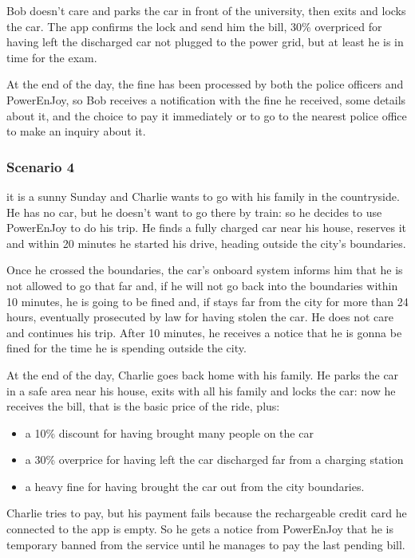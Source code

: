 \documentclass[11pt]{article} %
\newcommand{\pe}{PowerEnJoy }
\newcommand{\pecomma}{PowerEnJoy, }
\begin{document}
Bob doesn't care and parks the car in front of the university, then exits and locks the car. The app confirms the lock and send him the bill, 30\% overpriced for having left the discharged car not plugged to the power grid, but at least he is in time for the exam.

At the end of the day, the fine has been processed by both the police officers and \pecomma so Bob receives a notification with the fine he received, some details about it, and the choice to pay it immediately or to go to the nearest police office to make an inquiry about it.


\subsubsection{Scenario 4}
it is a sunny Sunday and Charlie wants to go with his family in the countryside. He has no car, but he doesn't want to go there by train: so he decides to use \pe to do his trip. He finds a fully charged car near his house, reserves it and within 20 minutes he started his drive, heading outside the city's boundaries.

Once he crossed the boundaries, the car's onboard system informs him that he is not allowed to go that far and, if he will not go back into the boundaries within 10 minutes, he is going to be fined and, if stays far from the city for more than 24 hours, eventually prosecuted by law for having stolen the car. He does not care and continues his trip. After 10 minutes, he receives a notice that he is gonna be fined for the time he is spending outside the city.

At the end of the day, Charlie goes back home with his family. He parks the car in a safe area near his house, exits with all his family and locks the car: now he receives the bill, that is the basic price of the ride, plus:
\begin{itemize}
	\item a 10\% discount for having brought many people on the car
	\item a 30\% overprice for having left the car discharged far from a charging station
	\item a heavy fine for having brought the car out from the city boundaries.
\end{itemize}
Charlie tries to pay, but his payment fails because the rechargeable credit card he connected to the app is empty. So he gets a notice from \pe that he is temporary banned from the service until he manages to pay the last pending bill.
\end{document}
